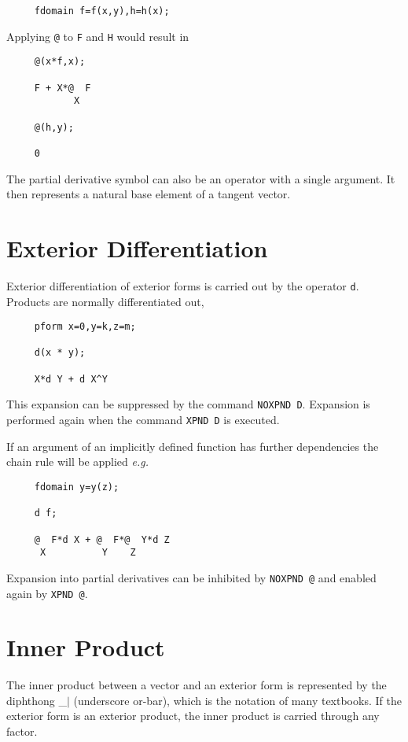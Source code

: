 \begin{verbatim}
     fdomain f=f(x,y),h=h(x);
\end{verbatim}

Applying {\tt @} to {\tt F} and {\tt H} would result in

\begin{verbatim}
     @(x*f,x);

     F + X*@  F
            X

     @(h,y);

     0
\end{verbatim}

The partial derivative symbol can also be an operator with a single
argument.  It then represents a natural base element of a tangent
vector\label{at1}.

\section{Exterior Differentiation}
Exterior differentiation of exterior forms is carried out by the
operator {\tt d}\label{d}.  Products are normally differentiated out,
\begin{verbatim}
     pform x=0,y=k,z=m;

     d(x * y);

     X*d Y + d X^Y
\end{verbatim}

This expansion can be suppressed by the command {\tt NOXPND
D}\label{NOXPNDD}.
Expansion is performed again when the command {\tt XPND D}\label{XPNDD}
is executed.

If an argument of an implicitly defined function has further
dependencies the chain rule will be applied {\em e.g.}


\begin{verbatim}
     fdomain y=y(z);

     d f;

     @  F*d X + @  F*@  Y*d Z
      X          Y    Z
\end{verbatim}

Expansion into partial derivatives can be inhibited by
{\tt NOXPND @}\label{NOXPNDA}
and enabled again by {\tt XPND @}\label{XPNDA}.

\section{Inner Product}
The inner product between a vector and an exterior form is represented
by the diphthong \_$|$ \label{innerp} (underscore or-bar), which is the
notation of many textbooks.  If the exterior form is an exterior
product, the inner product is carried through any factor.

